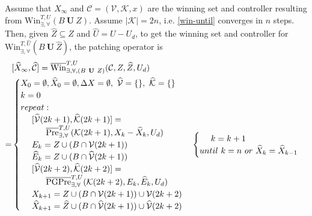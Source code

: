 Assume that $ X_\infty $ and $ \mathcal{C}=(\mathcal{V},\mathcal{K},x) $ are the winning set and controller resulting from $ \text{Win}_{\exists,\forall}^{T,U}(B\mathbf{\ U\ }Z) $. Assume $ \vert \mathcal{K}\vert = 2n $, i.e. \eqref{win-until} converges in $ n $ steps. Then, given $ \widehat{Z}\subseteq Z $ and $ \widehat{U}= U-U_d $, to get the winning set and controller for $ \text{Win}_{\exists,\forall}^{T,\widehat{U}}(B\mathbf{\ U\ }\widehat{Z}) $, the patching operator is
{\small\begin{align}
\begin{split}
&[\widehat{X}_\infty, \widehat{\mathcal{C}}]=\overline{\text{Win}}^{T, U}_{\exists,\forall, (B\mathbf{\ U\ }Z)}(\mathcal{C},Z,\widehat{Z}, U_d)\\
=&\begin{cases}
X_0 = \emptyset, \widehat{X}_0 = \emptyset, \Delta X = \emptyset, \ \widehat{\mathcal{V}}=\{\},\ \widehat{\mathcal{K}}=\{\}\\
{\color{black} k = 0}\\
{\color{black} repeat:}\\
\ \ \ \ [\widehat{\mathcal{V}}(2k+1),\widehat{\mathcal{K}}(2k+1)] =\\ \ \ \ \ \ \ \ \ \  \overline{\text{Pre}}_{\exists,\forall}^{T,U}(\mathcal{K}(2k+1),X_{k}-\widehat{X}_{k}, U_d)\\
\ \ \ \ E_k = Z\cup (B\cap \mathcal{V}(2k+1))\\
\ \ \ \  \widehat{E}_k =  Z\cup (B\cap \widehat{\mathcal{V}}(2k+1))\\
\ \ \ \ [\widehat{\mathcal{V}}(2k+2),\widehat{\mathcal{K}}(2k+2)] =\\ \ \ \ \ \ \ \ \ \  \overline{\text{PGPre}}_{\exists,\forall}^{T,U}(\mathcal{K}(2k+2),E_k, \widehat{E}_k,U_d)\\ 
\ \ \ \ X_{k+1} = Z\cup (B\cap \mathcal{V}(2k+1)) \cup \mathcal{V}(2k+2)\\
\ \ \ \ \widehat{X}_{k+1} =\widehat{Z}\cup (B\cap \widehat{\mathcal{V}}(2k+1)) \cup \widehat{\mathcal{V}}(2k+2)\\
\end{cases}
\begin{cases}
\ \ \ \ {\color{black} k = k +1}\\
{\color{black} until \ k = n \ or \ \widehat{X}_{k}=\widehat{X}_{k-1}}\\

\end{cases}
\end{split}
\end{align}}
